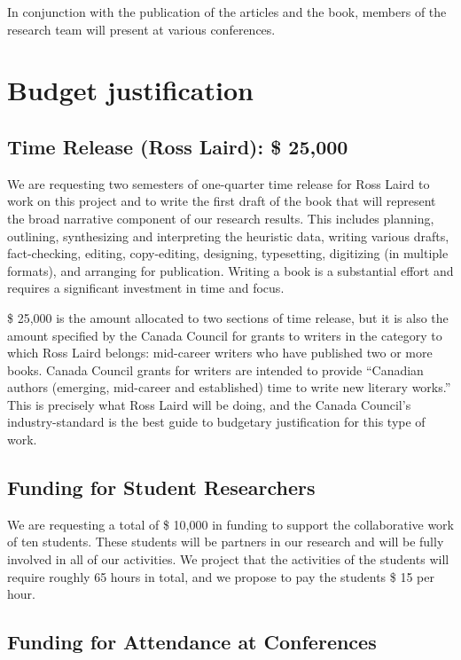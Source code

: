 \documentclass[letterpaper,10pt,headsepline]{scrreprt}
\begin{document}
In conjunction with the publication of the articles and the book, members of
the research team will present at various conferences.

\section{Budget justification}

\subsection{Time Release (Ross Laird): \$ 25,000}

We are requesting two semesters of one-quarter time release for Ross Laird to
work on this project and to write the first draft of the book that will
represent the broad narrative component of our research results. This includes
planning, outlining, synthesizing and interpreting the heuristic data, writing
various drafts, fact-checking, editing, copy-editing, designing, typesetting,
digitizing (in multiple formats), and arranging for publication. Writing a
book is a substantial effort and requires a significant investment in time and
focus.

\$ 25,000 is the amount allocated to two sections of time release, but it is
also the amount specified by the Canada Council for grants to writers in the
category to which Ross Laird belongs: mid-career writers who have published
two or more books. Canada Council grants for writers are intended to provide
``Canadian authors (emerging, mid-career and established) time to write new
literary works.'' This is precisely what Ross Laird will be doing, and the Canada
Council's industry-standard is the best guide to budgetary justification for
this type of work.

\subsection{Funding for Student Researchers}

We are requesting a total of \$ 10,000 in funding to support the collaborative
work of ten students. These students will be partners in our research and will
be fully involved in all of our activities. We project that the activities of
the students will require roughly 65 hours in total, and we propose to pay the
students \$ 15 per hour.

\subsection{Funding for Attendance at Conferences}
\end{document}
